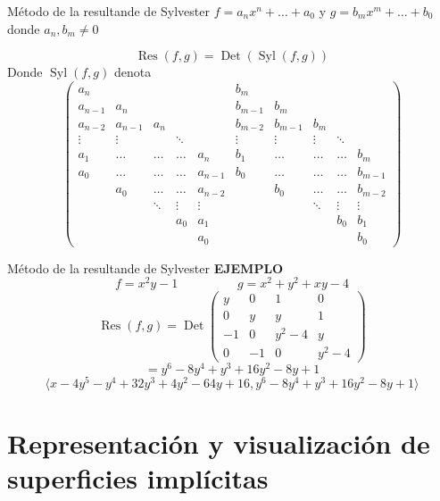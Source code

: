 \documentclass{beamer}
\begin{document}
\begin{frame}{Método de la resultande de Sylvester}
$f = a_n x^n + \dots + a_0$ y $g = b_m x^m + \dots + b_0$ donde $a_n, b_m \neq 0$
\pause

$$\operatorname{Res}(f,g) = \operatorname{Det}(\operatorname{Syl}(f,g))$$
Donde $\operatorname{Syl}(f,g)$ denota
\small
	$$\begin{pmatrix}
	a_n & & & & & b_m & & & & \\
	a_{n-1} & a_n & & & & b_{m-1} & b_m & & & \\
	a_{n-2} & a_{n-1} & a_n & & & b_{m-2} & b_{m-1} & b_m & & \\
	\vdots & \vdots & & \ddots & & \vdots & \vdots & \vdots & \ddots & \\
	a_1 & \dotso & \dotso & \dotso & a_{n} & b_1 & \dotso & \dotso & \dotso & b_{m} \\
	a_0 & \dotso & \dotso & \dotso & a_{n-1} & b_0 & \dotso & \dotso & \dotso & b_{m-1} \\
	 & a_0 & \dotso & \dotso & a_{n-2} & & b_0 & \dotso & \dotso & b_{m-2} \\
	 & & \ddots & \vdots & \vdots & & & \ddots & \vdots & \vdots \\
	 & & & a_0 & a_1 & & & & b_0 & b_1 \\
	 & & & & a_0 & & & & & b_0
	\end{pmatrix}$$
\end{frame}

\begin{frame}{Método de la resultande de Sylvester}
\textbf{EJEMPLO}
	$$f = x^2 y - 1 \hspace{2cm} g = x^2 + y^2 + xy - 4$$
\pause
	$$\operatorname{Res}(f,g) = \operatorname{Det} \begin{pmatrix}
	y & 0 & 1 & 0 \\
	0 & y & y & 1 \\
	-1 & 0 & y^2 - 4 & y \\
	0 & -1 & 0 & y^2 - 4
	\end{pmatrix}$$ $$= y^6 - 8y^4 + y^3 + 16y^2 - 8y + 1$$
\pause
	$$\langle x - 4y^5- y^4 + 32y^3 + 4y^2 - 64y + 16 , y^6 - 8y^4 + y^3 + 16y^2 - 8y + 1 \rangle$$
\end{frame}

\section{Representación y visualización de superficies implícitas}
\end{document}
